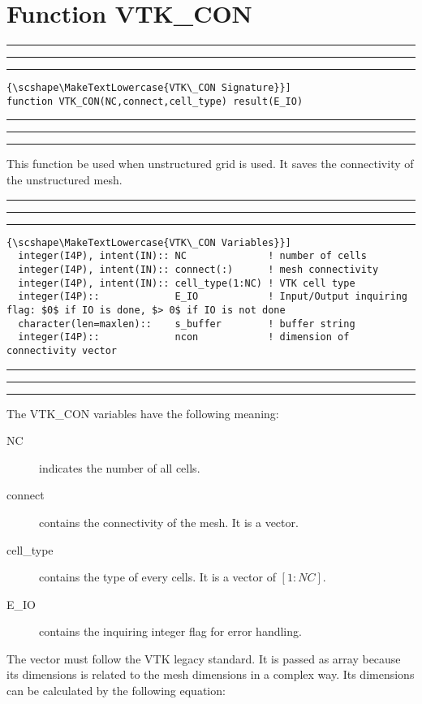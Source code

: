 \documentclass[pagesize=pdftex,fontsize=10pt,paper=a4,oneside]{scrbook}
\DeclareRobustCommand{\MarginNote}[1]{\marginpar{%
\slshape\footnotesize%
\parindent=0pt\lineskip=0pt\lineskiplimit=0pt%
\tolerance=2000\hyphenpenalty=300\exhyphenpenalty=300%
\doublehyphendemerits=100000\finalhyphendemerits=\doublehyphendemerits%
\raggedright\hspace{0pt}#1}}
\newenvironment{boxred}[1]%
               {%
                \noindent\hspace*{-0.025\textwidth}%
                \color{Maroon}%
                \rule[-5.8pt]{0.6pt}{6pt}\hspace*{-0.6pt}\rule{1.05\textwidth}{0.6pt}\hspace*{-0.6pt}\rule[-5.8pt]{0.6pt}{6pt}%
                \color{black}%
                \vspace*{0.6pt}\MarginNote{\color{Maroon}{#1}}%
               }%
               {%
                \noindent\hspace*{-0.025\textwidth}%
                \color{Maroon}%
                \rule[0pt]{0.6pt}{6pt}\hspace*{-0.6pt}\rule{1.05\textwidth}{0.6pt}\hspace*{-0.6pt}\rule[0pt]{0.6pt}{6pt}%
                \color{black}%
                \vspace*{2mm}%
               }
\DeclareRobustCommand{\MaiuscolettoBS}[1]{\textls[80]{\scshape\MakeTextLowercase{#1}}}
\begin{document}
\section{Function VTK\_CON}
\label{fun:VTK_CON}
 
 
\begin{boxred}{}
\begin{lstlisting}[style=signature,title=\color{Maroon}\MaiuscolettoBS{VTK\_CON Signature}]
function VTK_CON(NC,connect,cell_type) result(E_IO)
\end{lstlisting}
\end{boxred}
 
This function \MaiuscolettoBS{must} be used when unstructured grid is used. It saves the connectivity of the unstructured
mesh.


 
\begin{boxred}{}
\begin{lstlisting}[style=variables,title=\color{Maroon}\MaiuscolettoBS{VTK\_CON Variables}]
  integer(I4P), intent(IN):: NC              ! number of cells
  integer(I4P), intent(IN):: connect(:)      ! mesh connectivity
  integer(I4P), intent(IN):: cell_type(1:NC) ! VTK cell type
  integer(I4P)::             E_IO            ! Input/Output inquiring flag: $0$ if IO is done, $> 0$ if IO is not done
  character(len=maxlen)::    s_buffer        ! buffer string
  integer(I4P)::             ncon            ! dimension of connectivity vector 
\end{lstlisting}

\end{boxred}
 
The VTK\_CON variables have the following meaning:

\begin{description}
 \item[{\color{RoyalBlue}NC}] indicates the number of all cells.
 \item[{\color{RoyalBlue}connect}] contains the connectivity of the mesh. It is a vector.
 \item[{\color{RoyalBlue}cell\_type}] contains the type of every cells. It is a vector of $[1:NC]$.
 \item[{\color{RoyalBlue}E\_IO}] contains the inquiring integer flag for error handling.
\end{description}

The vector \MaiuscolettoBS{connect} must follow the VTK legacy standard. It is passed as \MaiuscolettoBS{assumed-shape} array
because its dimensions is related to the mesh dimensions in a complex way. Its dimensions can be calculated by the following
equation:
\end{document}
